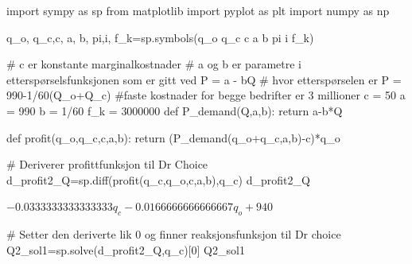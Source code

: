 \documentclass[
  12pt,
  a4paper,
  DIV=11,
  numbers=noendperiod]{scrartcl}
\newenvironment{Shaded}{\begin{snugshade}}{\end{snugshade}}
\newcommand{\CommentTok}[1]{\textcolor[rgb]{0.37,0.37,0.37}{#1}}
\newcommand{\ControlFlowTok}[1]{\textcolor[rgb]{0.00,0.23,0.31}{#1}}
\newcommand{\DecValTok}[1]{\textcolor[rgb]{0.68,0.00,0.00}{#1}}
\newcommand{\ImportTok}[1]{\textcolor[rgb]{0.00,0.46,0.62}{#1}}
\newcommand{\KeywordTok}[1]{\textcolor[rgb]{0.00,0.23,0.31}{#1}}
\newcommand{\NormalTok}[1]{\textcolor[rgb]{0.00,0.23,0.31}{#1}}
\newcommand{\OperatorTok}[1]{\textcolor[rgb]{0.37,0.37,0.37}{#1}}
\newcommand{\StringTok}[1]{\textcolor[rgb]{0.13,0.47,0.30}{#1}}
\begin{document}
\begin{Shaded}
\begin{Highlighting}[]
\ImportTok{import}\NormalTok{ sympy }\ImportTok{as}\NormalTok{ sp}
\ImportTok{from}\NormalTok{ matplotlib }\ImportTok{import}\NormalTok{ pyplot }\ImportTok{as}\NormalTok{ plt}
\ImportTok{import}\NormalTok{ numpy }\ImportTok{as}\NormalTok{ np}

\NormalTok{q\_o, q\_c,c, a, b, pi,i, f\_k}\OperatorTok{=}\NormalTok{sp.symbols(}\StringTok{\textquotesingle{}q\_o q\_c c a b pi i f\_k\textquotesingle{}}\NormalTok{)}


\CommentTok{\# c er konstante marginalkostnader}
\CommentTok{\# a og b er parametre i etterspørselsfunksjonen som er gitt ved P = a {-} bQ}
\CommentTok{\# hvor etterspørselen er P = 990{-}1/60(Q\_o+Q\_c)}
\CommentTok{\#faste kostnader for begge bedrifter er 3 millioner}
\NormalTok{c }\OperatorTok{=} \DecValTok{50}
\NormalTok{a }\OperatorTok{=} \DecValTok{990}
\NormalTok{b }\OperatorTok{=} \DecValTok{1}\OperatorTok{/}\DecValTok{60}
\NormalTok{f\_k }\OperatorTok{=} \DecValTok{3000000}
\KeywordTok{def}\NormalTok{ P\_demand(Q,a,b):}
    \ControlFlowTok{return}\NormalTok{ a}\OperatorTok{{-}}\NormalTok{b}\OperatorTok{*}\NormalTok{Q}

\KeywordTok{def}\NormalTok{ profit(q\_o,q\_c,c,a,b):}
    \ControlFlowTok{return}\NormalTok{ (P\_demand(q\_o}\OperatorTok{+}\NormalTok{q\_c,a,b)}\OperatorTok{{-}}\NormalTok{c)}\OperatorTok{*}\NormalTok{q\_o}
\end{Highlighting}
\end{Shaded}

\begin{Shaded}
\begin{Highlighting}[]
\CommentTok{\# Deriverer profittfunksjon til Dr Choice}
\NormalTok{d\_profit2\_Q}\OperatorTok{=}\NormalTok{sp.diff(profit(q\_c,q\_o,c,a,b),q\_c)}
\NormalTok{d\_profit2\_Q}
\end{Highlighting}
\end{Shaded}

$\displaystyle - 0.0333333333333333 q_{c} - 0.0166666666666667 q_{o} + 940$

\begin{Shaded}
\begin{Highlighting}[]
\CommentTok{\# Setter den deriverte lik 0 og finner reaksjonsfunksjon til Dr choice}
\NormalTok{Q2\_sol1}\OperatorTok{=}\NormalTok{sp.solve(d\_profit2\_Q,q\_c)[}\DecValTok{0}\NormalTok{]}
\NormalTok{Q2\_sol1}
\end{Highlighting}
\end{Shaded}
\end{document}
